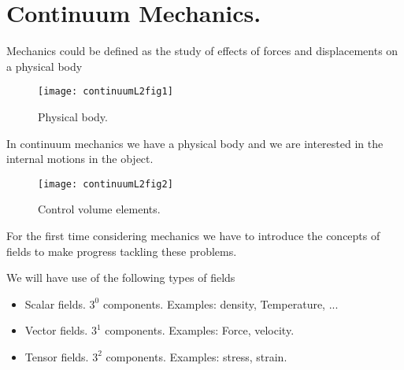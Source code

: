 % 
% 
% 
% 
% 
% 
% 
% 
% 
% 
% 
% 

\section{Continuum Mechanics.}

Mechanics could be defined as the study of effects of forces and displacements on a physical body

\begin{figure}[htp]
   \centering
   \texttt{[image: continuumL2fig1]}
   \caption{Physical body.}\label{fig:continuumL2:continuumL2fig1}
\end{figure}

In continuum mechanics we have a physical body and we are interested in the internal motions in the object.

\begin{figure}[htp]
   \centering
   \texttt{[image: continuumL2fig2]}
   \caption{Control volume elements.}\label{fig:continuumL2:continuumL2fig2}
\end{figure}

For the first time considering mechanics we have to introduce the concepts of fields to make progress tackling these problems.

We will have use of the following types of fields

\begin{itemize}
\item Scalar fields.  $3^0$ components.  Examples: density, Temperature, ...
\item Vector fields.  $3^1$ components.  Examples: Force, velocity.
\item Tensor fields.  $3^2$ components.  Examples: stress, strain.
\end{itemize}

